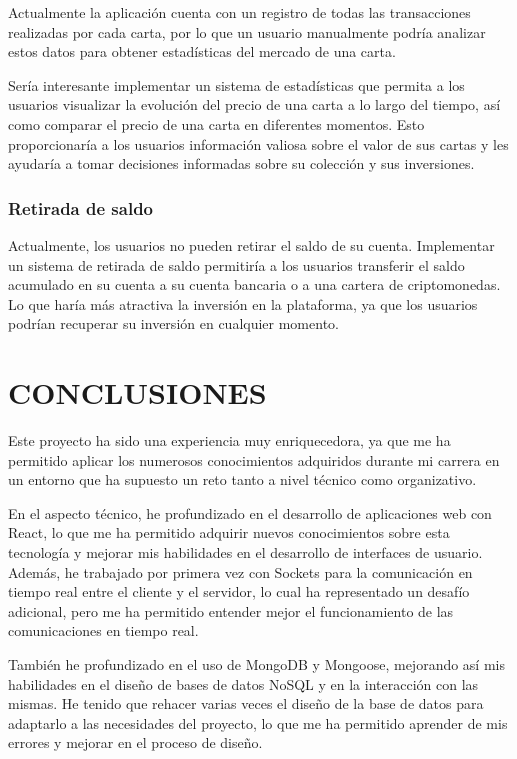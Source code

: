     Actualmente la aplicación cuenta con un registro de todas las transacciones realizadas por cada carta, por lo que un usuario manualmente podría analizar estos datos para obtener estadísticas del mercado de una carta.

    Sería interesante implementar un sistema de estadísticas que permita a los usuarios visualizar la evolución del precio de una carta a lo largo del tiempo,
    así como comparar el precio de una carta en diferentes momentos. Esto proporcionaría a los usuarios información valiosa sobre el valor de sus cartas y les ayudaría a tomar decisiones 
    informadas sobre su colección y sus inversiones.


    \subsubsection{Retirada de saldo}

    Actualmente, los usuarios no pueden retirar el saldo de su cuenta. 
    Implementar un sistema de retirada de saldo permitiría a los usuarios transferir el saldo acumulado en su cuenta a su cuenta bancaria o a una cartera de criptomonedas.
    Lo que haría más atractiva la inversión en la plataforma, ya que los usuarios podrían recuperar su inversión en cualquier momento.



\newpage
\section{CONCLUSIONES}

Este proyecto ha sido una experiencia muy enriquecedora, ya que me ha permitido aplicar los numerosos conocimientos adquiridos durante mi carrera en un entorno que ha supuesto un 
reto tanto a nivel técnico como organizativo.

En el aspecto técnico, he profundizado en el desarrollo de aplicaciones web con React, lo que me ha permitido adquirir nuevos conocimientos sobre esta tecnología y mejorar mis 
habilidades en el desarrollo de interfaces de usuario. Además, he trabajado por primera vez con Sockets para la comunicación en tiempo real entre el cliente y el servidor, 
lo cual ha representado un desafío adicional, pero me ha permitido entender mejor el funcionamiento de las comunicaciones en tiempo real.

También he profundizado en el uso de MongoDB y Mongoose, mejorando así mis habilidades en el diseño de bases de datos NoSQL y en la interacción con las mismas. 
He tenido que rehacer varias veces el diseño de la base de datos para adaptarlo a las necesidades del proyecto, lo que me ha permitido aprender de mis errores y mejorar en el proceso de diseño.

